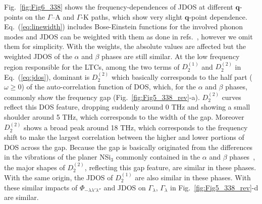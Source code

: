 \documentclass[twocolumn,amsmath,amssymb,a4paper,prb,superscriptaddress,floatfix]{revtex4-1}
\begin{document}
Fig.~\ref{fig:Fig6_338} shows the frequency-dependences of JDOS at different
$\mathbf{q}$-points on the $\Gamma$--A and $\Gamma$-K paths, which show very slight $\mathbf{q}$-point dependence.
Eq.~(\ref{eq:linewidth}) includes Bose-Einstein functions for the involved
phonon modes and JDOS can be weighted with them as done in
refs.~, however we omit them for
simplicity. With the weights, the absolute values are affected but the weighted
JDOS of the $\alpha$ and $\beta$ phases are still similar. At the low frequency
region responsible for the LTCs, among the two terms of $D_2^{(1)}$ and
$D_2^{(2)}$ in Eq.~(\ref{eq:jdos}), dominant is $D_2^{(2)}$ which basically
corresponds to the half part ($\omega \geq  0$) of the auto-correlation
function of DOS, which, for the $\alpha$ and $\beta$ phases, commonly show the
frequency gap (Fig.~\ref{fig:Fig5_338_rev}-a).  $D_2^{(2)}$ curves reflect this
DOS feature, dropping suddenly around 0 THz and showing a small shoulder around
5 THz, which corresponds to the width of the gap. Moreover $D_2^{(2)}$ shows a
broad peak around 18 THz, which corresponds to the frequency shift to make the
largest correlation between the higher and lower portions of DOS across the
gap.  Because the gap is basically originated from the differences in the
vibrations of the planer NSi$_3$ commonly contained in the $\alpha$ and $\beta$
phases~\cite{kuwabara}, the major shapes of $D_2^{(2)}$, reflecting this gap
feature, are similar in these phases. With the same origin, the JDOS of
$D_2^{(1)}$ are also similar in these phases. With these similar impacts of
$\Phi_{-\lambda\lambda'\lambda''}$ and JDOS on $\Gamma_\lambda$,
$\Gamma_\lambda$ in Fig.~\ref{fig:Fig5_338_rev}-d are similar.  
\end{document}
